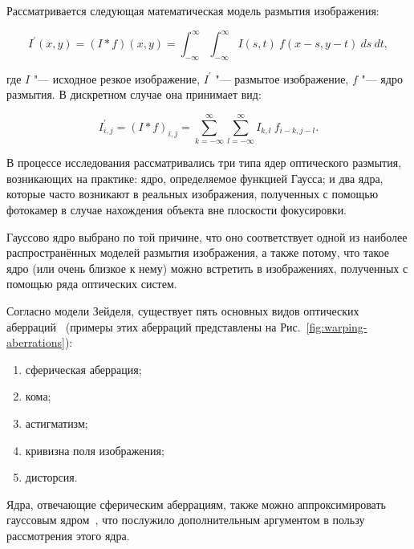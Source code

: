 Рассматривается следующая математическая модель размытия изображения:

\begin{equation*}
	I^\prime \left(x, y\right) = \left(I \ast f\right) \left(x, y\right) = \int_{-\infty}^{\infty}\int_{-\infty}^{\infty}{I\left(s,t\right)\ f\left(x-s,y-t\right)\ ds\ dt},
\end{equation*}

\noindent где $I$ "--- исходное резкое изображение, $I^\prime$ "--- размытое изображение, $f$ "--- ядро размытия. В дискретном случае она принимает вид:

\begin{equation*}
	I^\prime_{i,j} = \left(I \ast f\right)_{i,j} = \sum_{k=-\infty}^{\infty} \sum_{l=-\infty}^{\infty}{I_{k,l}\ f_{i-k,j-l}}.
\end{equation*}

В процессе исследования рассматривались три типа ядер оптического размытия, возникающих на практике: ядро, определяемое функцией Гаусса; и два ядра, которые часто возникают в реальных изображения, полученных с помощью фотокамер в случае нахождения объекта вне плоскости фокусировки.

Гауссово ядро выбрано по той причине, что оно соответствует одной из наиболее распространённых моделей размытия изображения, а также потому, что такое ядро (или очень близкое к нему) можно встретить в изображениях, полученных с помощью ряда оптических систем.

Согласно модели Зейделя, существует пять основных видов оптических аберраций~\cite{simpkins2014parameterized} (примеры этих аберраций представлены на Рис.~\ref{fig:warping-aberrations}):
\begin{enumerate}[beginpenalty=10000]
	\item сферическая аберрация;
	\item кома;
	\item астигматизм;
	\item кривизна поля изображения;
	\item дисторсия.
\end{enumerate}

\noindent Ядра, отвечающие сферическим аберрациям, также можно аппроксимировать гауссовым ядром~\cite{Miks:19, simpkins2014parameterized, simpkins2011modeling}, что послужило дополнительным аргументом в пользу рассмотрения этого ядра.

